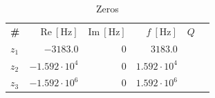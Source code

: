 \begin{table}[h]
\centering
\begin{tabular}[c]{lrrrrr}
\textbf{\#} & \textbf{$\mathrm{Re}\ [\mathrm{Hz}]$} & \textbf{$\mathrm{Im}\ [\mathrm{Hz}]$} & \textbf{$f\ [\mathrm{Hz}]$} & \textbf{$Q$} \\ 
\rowcolor{myyellow}
$z_{1}$ &$-3183.0$ &$0$ &$3183.0$ \\ 
$z_{2}$ &$-1.592 \cdot 10^{4}$ &$0$ &$1.592 \cdot 10^{4}$ \\ 
\rowcolor{myyellow}
$z_{3}$ &$-1.592 \cdot 10^{6}$ &$0$ &$1.592 \cdot 10^{6}$ \\ 
\end{tabular}
\caption{Zeros}
\end{table}

